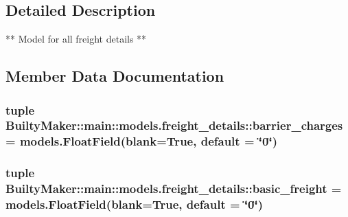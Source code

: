 \subsection{\-Detailed \-Description}
\begin{DoxyVerb}
** Model for all freight details **
\end{DoxyVerb}
 

\subsection{\-Member \-Data \-Documentation}
\hypertarget{classBuiltyMaker_1_1main_1_1models_1_1freight__details_a70c3d45d6dccd59af7622238f6ffb357}{
\subsubsection[{barrier\-\_\-charges}]{\setlength{\rightskip}{0pt plus 5cm}tuple {\bf \-Builty\-Maker\-::main\-::models.\-freight\-\_\-details\-::barrier\-\_\-charges} = models.\-Float\-Field(blank=\-True, default = \char`\"{}0\char`\"{})}}\label{classBuiltyMaker_1_1main_1_1models_1_1freight__details_a70c3d45d6dccd59af7622238f6ffb357}
\hypertarget{classBuiltyMaker_1_1main_1_1models_1_1freight__details_a542cdad1748fc5c52f3a94d6ec1421ef}{
\subsubsection[{basic\-\_\-freight}]{\setlength{\rightskip}{0pt plus 5cm}tuple {\bf \-Builty\-Maker\-::main\-::models.\-freight\-\_\-details\-::basic\-\_\-freight} = models.\-Float\-Field(blank=\-True, default = \char`\"{}0\char`\"{})}}\label{classBuiltyMaker_1_1main_1_1models_1_1freight__details_a542cdad1748fc5c52f3a94d6ec1421ef}
